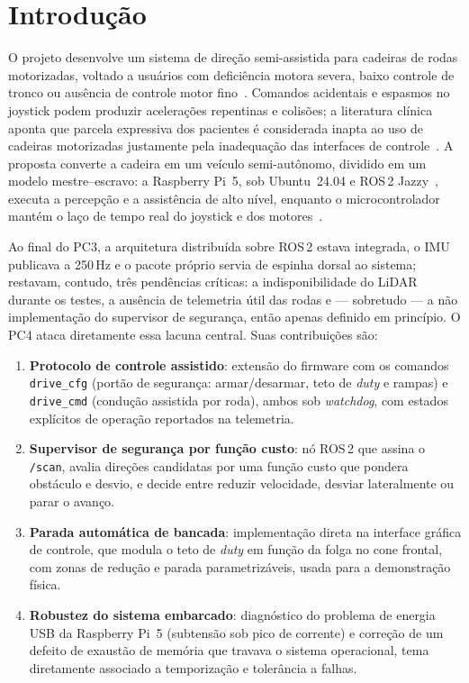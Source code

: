 \documentclass[conference]{IEEEtran}
\begin{document}
\section{Introdução}

O projeto desenvolve um sistema de direção semi-assistida para cadeiras de
rodas motorizadas, voltado a usuários com deficiência motora severa, baixo
controle de tronco ou ausência de controle motor fino~\cite{fehr2000,branco2018}.
Comandos acidentais e espasmos no joystick podem produzir acelerações
repentinas e colisões; a literatura clínica aponta que parcela expressiva dos
pacientes é considerada inapta ao uso de cadeiras motorizadas justamente pela
inadequação das interfaces de controle~\cite{fehr2000}. A proposta converte a
cadeira em um veículo semi-autônomo, dividido em um modelo mestre--escravo: a
Raspberry Pi~5, sob Ubuntu~24.04 e ROS\,2 Jazzy~\cite{ros2docs}, executa a
percepção e a assistência de alto nível, enquanto o microcontrolador mantém o
laço de tempo real do joystick e dos motores~\cite{ogata2010}.

Ao final do PC3, a arquitetura distribuída sobre ROS\,2 estava integrada, o IMU
publicava a 250\,Hz e o pacote próprio servia de espinha dorsal ao sistema;
restavam, contudo, três pendências críticas: a indisponibilidade do LiDAR
durante os testes, a ausência de telemetria útil das rodas e --- sobretudo ---
a não implementação do supervisor de segurança, então apenas definido em
princípio. O PC4 ataca diretamente essa lacuna central. Suas contribuições são:

\begin{enumerate}
\item \textbf{Protocolo de controle assistido}: extensão do firmware com os
comandos \texttt{drive\_cfg} (portão de segurança: armar/desarmar, teto de
\emph{duty} e rampas) e \texttt{drive\_cmd} (condução assistida por roda),
ambos sob \emph{watchdog}, com estados explícitos de operação reportados na
telemetria.

\item \textbf{Supervisor de segurança por função custo}: nó ROS\,2 que assina
o \texttt{/scan}, avalia direções candidatas por uma função custo que pondera
obstáculo e desvio, e decide entre reduzir velocidade, desviar lateralmente ou
parar o avanço.

\item \textbf{Parada automática de bancada}: implementação direta na interface
gráfica de controle, que modula o teto de \emph{duty} em função da folga no
cone frontal, com zonas de redução e parada parametrizáveis, usada para a
demonstração física.

\item \textbf{Robustez do sistema embarcado}: diagnóstico do problema de
energia USB da Raspberry Pi~5 (subtensão sob pico de corrente) e correção de um
defeito de exaustão de memória que travava o sistema operacional, tema
diretamente associado a temporização e tolerância a falhas.
\end{enumerate}
\end{document}
